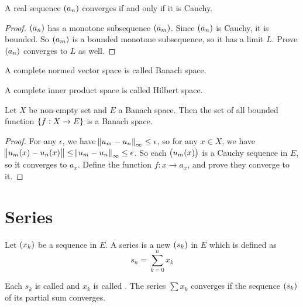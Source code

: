 \begin{theorem}
    A real sequence $\sequence{a_n}$ converges if and only if it is Cauchy.
\end{theorem}
\begin{proof}
    $\sequence{a_n}$ has a monotone subsequence $\sequence{a_m}$. Since $\sequence{a_n}$ is Cauchy, it is bounded. So $\sequence{a_m}$ is a bounded monotone subsequence, so it has a limit $L$. Prove $\sequence{a_n}$ converges to $L$ as well.
\end{proof}

\begin{definition}
    A complete normed vector space is called Banach space.
\end{definition}

\begin{definition}
    A complete inner product space is called Hilbert space.
\end{definition}

\begin{theorem}
    Let $X$ be non-empty set and $E$ a Banach space. Then the set of all bounded function $\set{f: X \rightarrow E}$ is a Banach space.
\end{theorem}
\begin{proof}
    For any $\epsilon$, we have $\norm{u_m - u_n}_\infty \leq \epsilon$, so for any $x \in X$, we have $\norm{u_m (x) - u_n (x)} \leq \norm{u_m - u_n}_\infty \leq \epsilon$. So each $\sequence{u_m (x)}$ is a Cauchy sequence in $E$, so it converges to $a_x$. Define the function $f: x \rightarrow a_x$, and prove they converge to it.
\end{proof}



\section{Series}

\begin{definition}
    Let $\sequence{x_k}$ be a sequence in $E$. A series is a new $\sequence{s_k}$ in $E$ which is defined as
    \begin{equation}
        s_n = \sum_{k=0}^n x_k
    \end{equation}
    
    Each $s_k$ is called  and $x_k$ is called . The series $\sum x_k$ converges if the sequence $\sequence{s_k}$ of its partial sum converges.
\end{definition}

